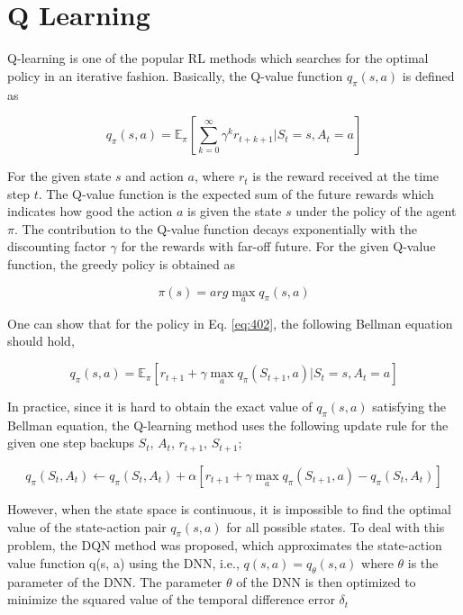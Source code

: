 \section{Q Learning}

Q-learning is one of the popular RL methods which searches for the optimal policy in an iterative fashion. Basically, the Q-value function $q_{\pi} (s, a)$ is defined as

\begin{equation}
q_\pi(s,a) = \mathbb{E}_\pi \left[ \sum _{k=0}^{\infty} \gamma ^k r_{t+k+1} | S_t = s, A_t = a \right]
\end{equation}

For the given state $s$ and action $a$, where $r_t$ is the reward received at the time step $t$. The Q-value function is the expected sum of the future rewards which indicates how good the action $a$ is given the state $s$ under the policy of the agent $\pi$. The contribution to the Q-value function decays exponentially with the discounting factor $\gamma$ for the rewards with far-off future. For the given Q-value function, the greedy policy is obtained as

\begin{equation} \label{eq:402}
\pi(s) = arg \max_a q_{\pi} (s, a) 
\end{equation}

One can show that for the policy in Eq. \ref{eq:402}, the following Bellman equation should hold,

\begin{equation}
q_\pi(s,a) = \mathbb{E}_\pi [r_{t+1} + \gamma \max_a q_\pi(S_{t+1},a) | S_t = s, A_t = a]
\end{equation}

In practice, since it is hard to obtain the exact value of $q_{\pi}(s, a)$ satisfying the Bellman equation, the Q-learning method uses the following update rule for the given one step backups $S_t$, $A_t$, $r_{t+1}$, $S_{t+1}$;

\begin{equation}
q_\pi(S_t,A_t) \gets q_\pi(S_t,A_t) + \alpha \left[r_{t+1} + \gamma \max_a q_\pi(S_{t+1},a) - q_\pi(S_t,A_t)\right]
\end{equation}

However, when the state space is continuous, it is impossible to find the optimal value of the state-action pair $q_{\pi} (s, a)$ for all possible states. To deal with this problem, the DQN method was proposed, which approximates the state-action value function q(s, a) using the DNN, i.e., $q(s, a) = q_\theta(s, a)$ where $\theta$ is the parameter of the DNN. The parameter $\theta$ of the DNN is then optimized to minimize the squared value of the temporal difference error $\delta_t$

